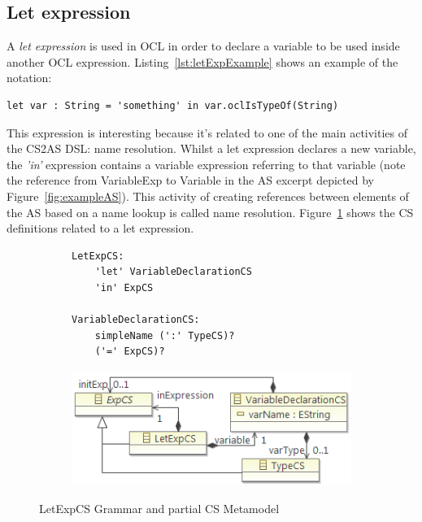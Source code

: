 \documentclass{llncs}
\begin{document}
\subsection{Let expression}

A \textit{let expression} is used in OCL in order to declare a variable to be used inside another OCL expression. Listing~\ref{lst:letExpExample} shows an example of the notation:

\begin{lstlisting}[label=lst:letExpExample, language=OCL]
let var : String = 'something' in var.oclIsTypeOf(String)
\end{lstlisting}

This expression is interesting because it's related to one of the main activities of the CS2AS DSL: name resolution. Whilst a let expression declares a new variable, the \emph{'in'} expression contains a variable expression referring to that variable (note the reference from VariableExp to Variable in the AS excerpt depicted by Figure~\ref{fig:exampleAS}). This activity of creating  references between elements of the AS based on a name lookup is called name resolution. Figure~\ref{fig:LetExpCS} shows the CS definitions related to a let expression.

\begin{figure}[htbp]
\centering
\begin{subfigure}{0.5\textwidth}
  \centering
  \begin{lstlisting}[label=lst:letExpEBNF, language=Xtext]
LetExpCS:
    'let' VariableDeclarationCS 
  	'in' ExpCS
  	
VariableDeclarationCS:
    simpleName (':' TypeCS)?
    ('=' ExpCS)?	
  \end{lstlisting} 
\end{subfigure}%
\begin{subfigure}{0.5\textwidth}
  \centering
  \includegraphics[scale=0.75]{images/LetExpCS.png}
\end{subfigure}
\caption{LetExpCS Grammar and partial CS Metamodel}
\label{fig:LetExpCS}
\end{figure}
\end{document}
